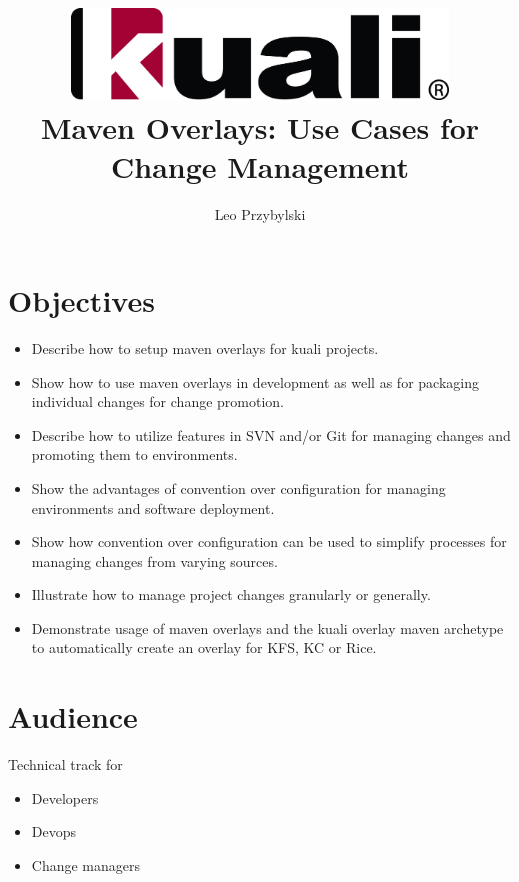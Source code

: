 \documentclass[12pt,notitlepage]{article}
\author{Leo Przybylski}
\title{\includegraphics[width=0.75\textwidth]{kuali_base.png}\\Maven
  Overlays: Use Cases for Change Management}
\date{}
\begin{document}
\maketitle
{}

\section{Objectives}
\begin{itemize}
\item Describe how to setup maven overlays for kuali projects.
\item Show how to use maven overlays in development as well as for packaging
  individual changes for change promotion.
\item Describe how to utilize features in SVN and/or Git for managing
  changes and promoting them to environments.
\item Show the advantages of convention over configuration for
  managing environments and software deployment.
\item Show how convention over configuration can be used to simplify
  processes for managing changes from varying sources.
\item Illustrate how to manage project changes granularly or
  generally.
  \item Demonstrate usage of maven overlays and the kuali overlay
    maven archetype to automatically create an overlay for KFS, KC or Rice.
\end{itemize}

\section{Audience}
Technical track for
\begin{itemize}
\item Developers
\item Devops
\item Change managers
\end{itemize}
\end{document}
